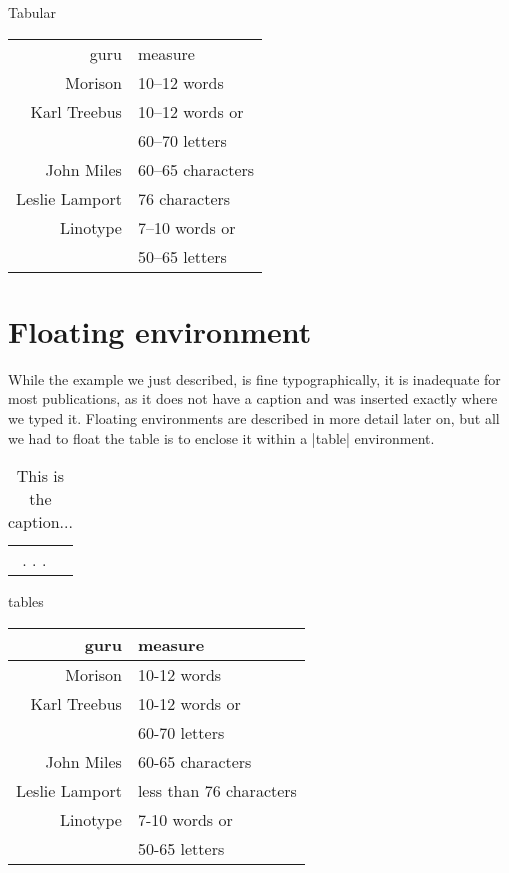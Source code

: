 \begin{texexample}{Tabular}{}{}
\begin{tabular}{rl}
\toprule
guru 			& measure \\
Morison      & 10--12 words \\
Karl Treebus & 10--12 words or\\
             & 60--70 letters \\
John Miles   & 60--65 characters \\
Leslie Lamport & 76 characters \\
Linotype       & 7--10 words or\\
& 50--65 letters\\
\bottomrule
\end{tabular} 
\end{texexample}


\section{Floating environment} 

While the example we just described, is fine typographically, it is inadequate for most publications, as it does not have a caption and was inserted exactly where we typed it. Floating environments are described in more detail later on, but all we had to float the table is to enclose it within a |table| environment.

\begin{teXXX}
\begin{table}[htp]
\begin{tabular}{rl}
.
.
.
\end{tabular}
\caption{This is the caption...}
\end{table}
\end{teXXX}

\begin{texexample}{tables}{}
\centering
\begin{tabular}{rl}
\toprule
  guru                  & measure \\
\midrule
  Morison             & 10-12 words \\
  Karl Treebus      & 10-12 words or\\
                          & 60-70 letters \\
  John Miles         & 60-65 characters \\
  Leslie Lamport   & less than 76 characters \\
  Linotype            & 7-10 words or\\
                         & 50-65 letters\\
\bottomrule
\end{tabular}
\end{texexample}


